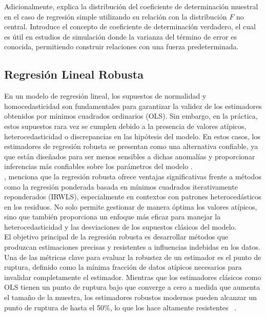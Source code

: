 Adicionalmente, \textcite{christou-2005} explica la distribución del coeficiente de determinación muestral en el caso de regresión simple utilizando su relación con la distribución \(F\) no central. Introduce el concepto de coeficiente de determinación verdadero, el cual es útil en estudios de simulación donde la varianza del término de error es conocida, permitiendo construir relaciones con una fuerza predeterminada.\\







\subsection{Regresión Lineal Robusta}
En un modelo de regresión lineal, los supuestos de normalidad y homocedasticidad son fundamentales para garantizar la validez de los estimadores obtenidos por mínimos cuadrados ordinarios (OLS). Sin embargo, en la práctica, estos supuestos rara vez se cumplen debido a la presencia de valores atípicos, heterocedasticidad o discrepancias en las hipótesis del modelo. En estos casos, los estimadores de regresión robusta se presentan como una alternativa confiable, ya que están diseñados para ser menos sensibles a dichas anomalías y proporcionar inferencias más confiables sobre los parámetros del modelo \parencite{zacarias-2023}.\\

\textcite{annalisa-2024}, menciona que la regresión robusta ofrece ventajas significativas frente a métodos como la regresión ponderada basada en mínimos cuadrados iterativamente reponderados (IRWLS), especialmente en contextos con patrones heterocedásticos en los residuos. No solo permite gestionar de manera óptima los valores atípicos, sino que también proporciona un enfoque más eficaz para manejar la heterocedasticidad y las desviaciones de los supuestos clásicos del modelo.\\


El objetivo principal de la regresión robusta es desarrollar métodos que produzcan estimaciones precisas y resistentes a influencias indebidas en los datos. Una de las métricas clave para evaluar la robustez de un estimador es el punto de ruptura, definido como la mínima fracción de datos atípicos necesarios para invalidar completamente el estimador. Mientras que los estimadores clásicos como OLS tienen un punto de ruptura bajo que converge a cero a medida que aumenta el tamaño de la muestra, los estimadores robustos modernos pueden alcanzar un punto de ruptura de hasta el 50\%, lo que los hace altamente resistentes ~\parencites{siegel-1982,rousseeuw-1984}. \\

